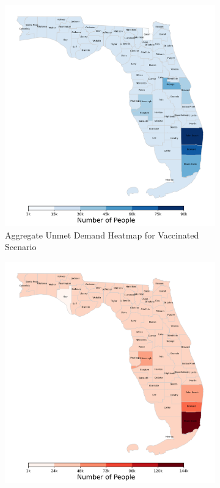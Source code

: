 \documentclass{article}
\begin{document}
\begin{figure}
    \centering
    \begin{subfigure}{0.43\linewidth}
        \centering
        \includegraphics[width=\linewidth]{pics/totalUnmetDemandVax0.1.png}
        \caption{Aggregate Unmet Demand Heatmap for Vaccinated Scenario}\label{fig:udHeatmapVax}
    \end{subfigure}
    \hspace{2em}
    \begin{subfigure}{0.43\linewidth}
        \centering
        \includegraphics[width=\linewidth]{pics/totalUnmetDemandNoVax.png}

\end{subfigure}
\end{figure}
\end{document}
